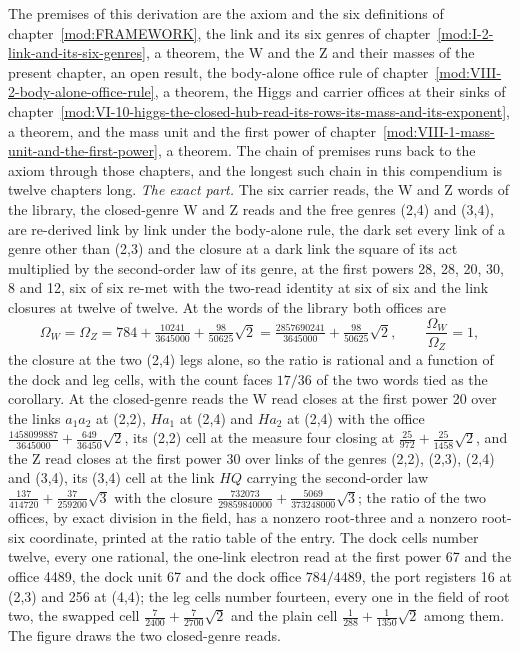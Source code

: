 \begin{chproof}
The premises of this derivation are the axiom and the six definitions of chapter~\ref{mod:FRAMEWORK}, the link and its six genres of chapter~\ref{mod:I-2-link-and-its-six-genres}, a theorem, the W and the Z and their masses of the present chapter, an open result, the body-alone office rule of chapter~\ref{mod:VIII-2-body-alone-office-rule}, a theorem, the Higgs and carrier offices at their sinks of chapter~\ref{mod:VI-10-higgs-the-closed-hub-read-its-rows-its-mass-and-its-exponent}, a theorem, and the mass unit and the first power of chapter~\ref{mod:VIII-1-mass-unit-and-the-first-power}, a theorem. The chain of premises runs back to the axiom through those chapters, and the longest such chain in this compendium is twelve chapters long.
\textit{The exact part.} The six carrier reads, the W and Z words of the library, the closed-genre W and Z reads and the free genres (2,4) and (3,4), are re-derived link by link under the body-alone rule, the dark set every link of a genre other than (2,3) and the closure at a dark link the square of its act multiplied by the second-order law of its genre, at the first powers 28, 28, 20, 30, 8 and 12, six of six re-met with the two-read identity at six of six and the link closures at twelve of twelve. At the words of the library both offices are
\begin{equation} \Omega_{W} = \Omega_{Z} = 784 + \tfrac{10241}{3645000} + \tfrac{98}{50625}\sqrt{2} = \tfrac{2857690241}{3645000} + \tfrac{98}{50625}\sqrt{2}, \qquad \frac{\Omega_{W}}{\Omega_{Z}} = 1, \end{equation}
the closure at the two (2,4) legs alone, so the ratio is rational and a function of the dock and leg cells, with the count faces $17/36$ of the two words tied as the corollary. At the closed-genre reads the W read closes at the first power 20 over the links $a_{1}a_{2}$ at (2,2), $Ha_{1}$ at (2,4) and $Ha_{2}$ at (2,4) with the office $\tfrac{1458099887}{3645000} + \tfrac{649}{36450}\sqrt{2}$, its (2,2) cell at the measure four closing at $\tfrac{25}{972} + \tfrac{25}{1458}\sqrt{2}$, and the Z read closes at the first power 30 over links of the genres (2,2), (2,3), (2,4) and (3,4), its (3,4) cell at the link $HQ$ carrying the second-order law $\tfrac{137}{414720} + \tfrac{37}{259200}\sqrt{3}$ with the closure $\tfrac{732073}{29859840000} + \tfrac{5069}{373248000}\sqrt{3}$; the ratio of the two offices, by exact division in the field, has a nonzero root-three and a nonzero root-six coordinate, printed at the ratio table of the entry. The dock cells number twelve, every one rational, the one-link electron read at the first power 67 and the office 4489, the dock unit 67 and the dock office $784/4489$, the port registers 16 at (2,3) and 256 at (4,4); the leg cells number fourteen, every one in the field of root two, the swapped cell $\tfrac{7}{2400} + \tfrac{7}{2700}\sqrt{2}$ and the plain cell $\tfrac{1}{288} + \tfrac{1}{1350}\sqrt{2}$ among them. The figure draws the two closed-genre reads.

\end{chproof}
